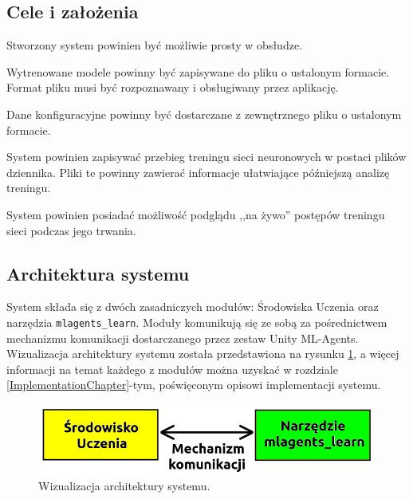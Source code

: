 \subsection{Cele i założenia}
\begin{enumerate*}
\item Stworzony system powinien być możliwie prosty w obsłudze.
\item Wytrenowane modele powinny być zapisywane do pliku o ustalonym formacie. Format pliku musi być rozpoznawany i obsługiwany przez aplikację.
\item Dane konfiguracyjne powinny być dostarczane z zewnętrznego pliku o ustalonym formacie.
\item System powinien zapisywać przebieg treningu sieci neuronowych w postaci plików dziennika. Pliki te powinny zawierać informacje ułatwiające późniejszą analizę treningu.
\item System powinien posiadać możliwość podglądu ,,na żywo'' postępów treningu sieci podczas jego trwania.
\end{enumerate*}

\subsection{Architektura systemu}
\label{SoftwareArchSection}
System składa się z dwóch zasadniczych modułów: Środowiska Uczenia oraz narzędzia \texttt{mlagents\_learn}. Moduły komunikują się ze sobą za pośrednictwem mechanizmu komunikacji dostarczanego przez zestaw Unity ML-Agents. Wizualizacja architektury systemu została przedstawiona na rysunku \ref{SystemArchitecture}, a więcej informacji na temat każdego z modułów można uzyskać w rozdziale \ref{ImplementationChapter}-tym, poświęconym opisowi implementacji systemu. \\

\begin{figure}[h]
\begin{center}
\includegraphics[width=15cm]{resources/figures/system_architecture.png}
\caption{Wizualizacja architektury systemu.}
\label{SystemArchitecture}
\end{center}
\end{figure}

